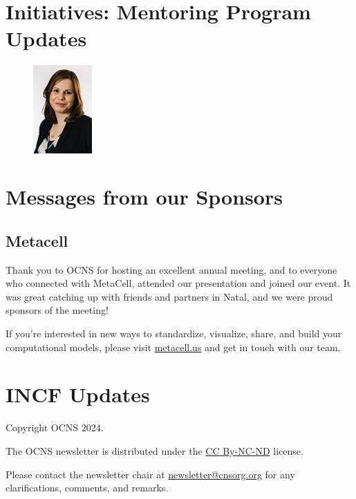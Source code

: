 \documentclass[11pt,a4paper,oneside]{article}
\begin{document}
\section*{Initiatives: Mentoring Program Updates}%
\begin{figure}
  \includegraphics[width=0.2\textwidth]{images/Mavritsaki}
\end{figure}

\lipsum[1-2]

\clearpage
\section*{Messages from our Sponsors}%
\subsection*{Metacell}%
\begin{displayquote}
  Thank you to OCNS for hosting an excellent annual meeting, and to everyone who connected with MetaCell, attended our presentation and joined our event.
  It was great catching up with friends and partners in Natal, and we were proud sponsors of the meeting!

  If you're interested in new ways to standardize, visualize, share, and build your computational models, please visit \url{metacell.us} and get in touch with our team.
\end{displayquote}

\clearpage
\section*{INCF Updates}%
\lipsum[1-3]

\clearpage

\clearpage

\clearpage
\vspace*{\fill}
\begin{center}
  \begin{minipage}{\textwidth}
    \begin{center}
      Copyright \textcopyright{} OCNS 2024.

      The OCNS newsletter is distributed under the \href{https://creativecommons.org/licenses/by-nc-nd/4.0/}{CC By-NC-ND} license.

      Please contact the newsletter chair at \href{mailto:newsletter@cnsorg.org}{newsletter@cnsorg.org} for any clarifications, comments, and remarks.
    \end{center}
  \end{minipage}
\end{center}
\vfill
\clearpage
\end{document}
